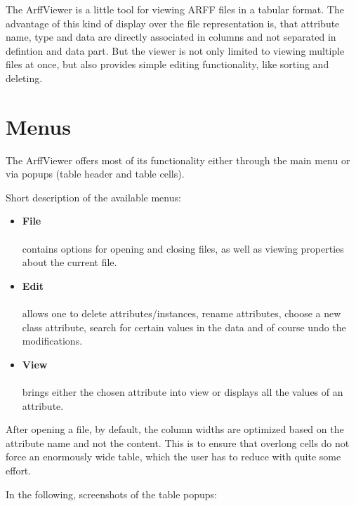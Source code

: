
The ArffViewer is a little tool for viewing ARFF files in a tabular format. The advantage of this kind of display over the file representation is, that attribute name, type and data are directly associated in columns and not separated in defintion and data part. But the viewer is not only limited to viewing multiple files at once, but also provides simple editing functionality, like sorting and deleting.

\begin{center}
\end{center}

\newpage
\section{Menus}
The ArffViewer offers most of its functionality either through the main menu or via popups (table header and table cells). 

Short description of the available menus:
\begin{itemize}
	\item \textbf{File} \\
		 \\
		contains options for opening and closing files, as well as viewing properties about the current file.
	\item \textbf{Edit} \\
		 \\
		allows one to delete attributes/instances, rename attributes, choose a new class attribute, search for certain values in the data and of course undo the modifications.
	\item \textbf{View} \\
		 \\
		brings either the chosen attribute into view or displays all the values of an attribute. 
\end{itemize}

After opening a file, by default, the column widths are optimized based on the attribute name and not the content. This is to ensure that overlong cells do not force an enormously wide table, which the user has to reduce with quite some effort. 

\newpage
In the following, screenshots of the table popups:
\begin{center}
\end{center}

